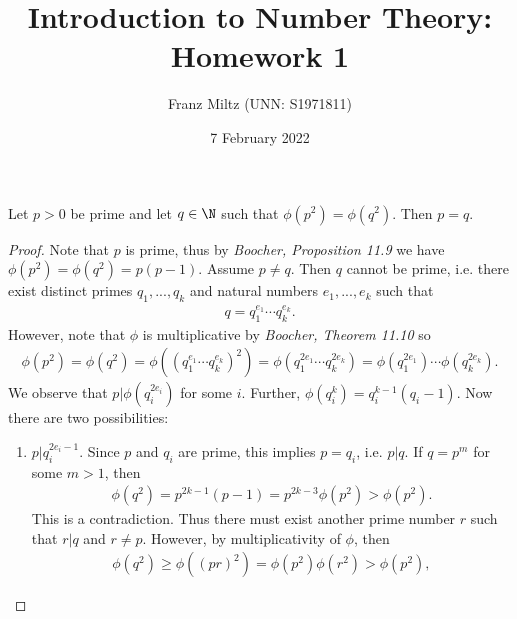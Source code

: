 \documentclass{article}
\begin{document}
\title{Introduction to Number Theory: Homework 1}
\author{Franz Miltz (UNN: S1971811)}
\date{7 February 2022}
\maketitle

\begin{claim*}[1]
   Let $p>0$ be prime and let $q\in\N$ such that $\phi\left(p^2\right) = \phi\left(q^2\right)$.
   Then $p=q$.
   \begin{proof}
      Note that $p$ is prime, thus by \emph{Boocher, Proposition 11.9} we
      have $\phi\left(p^2\right)=\phi\left(q^2\right)=p(p-1)$. Assume $p\not= q$.
      Then $q$ cannot be prime, i.e. there exist distinct primes $q_1,...,q_k$ and natural
      numbers $e_1,...,e_k$ such that
      \begin{align*}
         q = q_1^{e_1}\cdots q_k^{e_k}.
      \end{align*}
      However, note that $\phi$ is multiplicative by \emph{Boocher, Theorem 11.10}
      so
      \begin{align}
         \label{factorisation}
         \phi(p^2)
         =\phi(q^2)
         =\phi\left(\left(q_1^{e_1}\cdots q_k^{e_k}\right)^2\right)
         =\phi\left(q_1^{2e_1}\cdots q_k^{2e_k}\right)
         =\phi\left(q_1^{2e_1}\right)\cdots\phi\left(q_k^{2e_k}\right).
      \end{align}
      We observe that $p|\phi\left(q_i^{2e_i}\right)$ for some $i$.
      Further, $\phi\left(q_i^k\right)=q_i^{k-1}(q_i-1)$. Now there are two possibilities:
      \begin{enumerate}
         \item $p|q_i^{2e_i-1}$. Since $p$ and $q_i$ are prime, this implies
               $p=q_i$, i.e. $p|q$. If $q=p^m$ for some $m>1$, then \begin{align*}
                  \phi\left(q^2\right)=p^{2k-1}(p-1)=p^{2k-3}\phi\left(p^2\right)
                  >\phi\left(p^2\right).
               \end{align*}
               This is a contradiction. Thus there must exist another prime number $r$
               such that $r|q$ and $r\not=p$. However, by multiplicativity of $\phi$,
               then
               \begin{align*}
                  \phi\left(q^2\right)
                  \geq \phi\left((pr)^2\right)
                  = \phi\left(p^2\right)\phi\left(r^2\right)
                  >    \phi\left(p^2\right) ,
               \end{align*}

\end{enumerate}
\end{proof}
\end{claim*}
\end{document}
